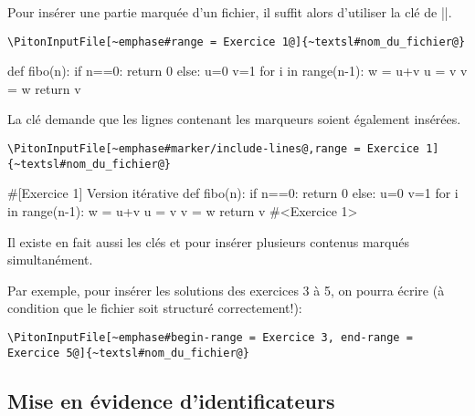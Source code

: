 \documentclass[dvipsnames,svgnames]{article}
\begin{document}
\bigskip
Pour insérer une partie marquée d'un fichier, il suffit alors d'utiliser la clé  de
|\PitonInputFile|. 

\smallskip
\begin{Verbatim}
\PitonInputFile[~emphase#range = Exercice 1@]{~textsl#nom_du_fichier@}
\end{Verbatim}

\medskip
\begin{Piton}
def fibo(n):
    if n==0: return 0 
    else:
        u=0
        v=1
        for i in range(n-1):
            w = u+v
            u = v
            v = w
        return v
\end{Piton}

\vspace{1cm}
La clé  demande que les lignes contenant les marqueurs soient également insérées.

\begin{Verbatim}
\PitonInputFile[~emphase#marker/include-lines@,range = Exercice 1]{~textsl#nom_du_fichier@}
\end{Verbatim}

\begin{Piton}
#[Exercice 1] Version itérative
def fibo(n):
    if n==0: return 0 
    else:
        u=0
        v=1
        for i in range(n-1):
            w = u+v
            u = v
            v = w
        return v
#<Exercice 1>
\end{Piton}


\bigskip
{}
Il existe en fait aussi les clés  et  pour insérer plusieurs
contenus marqués simultanément. 

Par exemple, pour insérer les solutions des exercices 3 à 5, on pourra écrire (à condition que le fichier soit
structuré correctement!):

\begin{Verbatim}
\PitonInputFile[~emphase#begin-range = Exercice 3, end-range = Exercice 5@]{~textsl#nom_du_fichier@}
\end{Verbatim}




\subsection{Mise en évidence d'identificateurs}

\label{SetPitonIdentifier}
\end{document}
